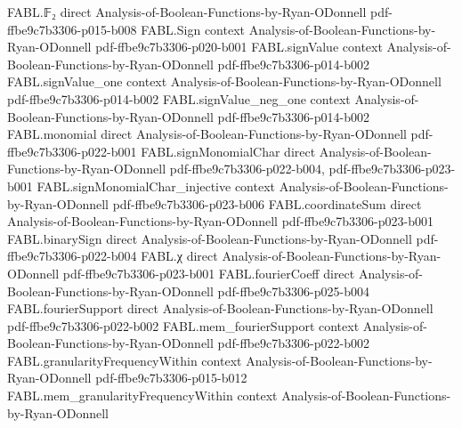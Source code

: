 \begin{theorem}
\label{FABL.sum_restrictedFourierWeight_eq_sum_sq_fourierCoeff}
\leanok
{}
\proofstep
  {FABL.𝔽₂}
  {direct}
  {Analysis-of-Boolean-Functions-by-Ryan-ODonnell}
  {pdf-ffbe9c7b3306-p015-b008}
\proofstep
  {FABL.Sign}
  {context}
  {Analysis-of-Boolean-Functions-by-Ryan-ODonnell}
  {pdf-ffbe9c7b3306-p020-b001}
\proofstep
  {FABL.signValue}
  {context}
  {Analysis-of-Boolean-Functions-by-Ryan-ODonnell}
  {pdf-ffbe9c7b3306-p014-b002}
\proofstep
  {FABL.signValue_one}
  {context}
  {Analysis-of-Boolean-Functions-by-Ryan-ODonnell}
  {pdf-ffbe9c7b3306-p014-b002}
\proofstep
  {FABL.signValue_neg_one}
  {context}
  {Analysis-of-Boolean-Functions-by-Ryan-ODonnell}
  {pdf-ffbe9c7b3306-p014-b002}
\proofstep
  {FABL.monomial}
  {direct}
  {Analysis-of-Boolean-Functions-by-Ryan-ODonnell}
  {pdf-ffbe9c7b3306-p022-b001}
\proofstep
  {FABL.signMonomialChar}
  {direct}
  {Analysis-of-Boolean-Functions-by-Ryan-ODonnell}
  {pdf-ffbe9c7b3306-p022-b004,
    pdf-ffbe9c7b3306-p023-b001}
\proofstep
  {FABL.signMonomialChar_injective}
  {context}
  {Analysis-of-Boolean-Functions-by-Ryan-ODonnell}
  {pdf-ffbe9c7b3306-p023-b006}
\proofstep
  {FABL.coordinateSum}
  {direct}
  {Analysis-of-Boolean-Functions-by-Ryan-ODonnell}
  {pdf-ffbe9c7b3306-p023-b001}
\proofstep
  {FABL.binarySign}
  {direct}
  {Analysis-of-Boolean-Functions-by-Ryan-ODonnell}
  {pdf-ffbe9c7b3306-p022-b004}
\proofstep
  {FABL.χ}
  {direct}
  {Analysis-of-Boolean-Functions-by-Ryan-ODonnell}
  {pdf-ffbe9c7b3306-p023-b001}
\proofstep
  {FABL.fourierCoeff}
  {direct}
  {Analysis-of-Boolean-Functions-by-Ryan-ODonnell}
  {pdf-ffbe9c7b3306-p025-b004}
\proofstep
  {FABL.fourierSupport}
  {direct}
  {Analysis-of-Boolean-Functions-by-Ryan-ODonnell}
  {pdf-ffbe9c7b3306-p022-b002}
\proofstep
  {FABL.mem_fourierSupport}
  {context}
  {Analysis-of-Boolean-Functions-by-Ryan-ODonnell}
  {pdf-ffbe9c7b3306-p022-b002}
\proofstep
  {FABL.granularityFrequencyWithin}
  {context}
  {Analysis-of-Boolean-Functions-by-Ryan-ODonnell}
  {pdf-ffbe9c7b3306-p015-b012}
\proofstep
  {FABL.mem_granularityFrequencyWithin}
  {context}
  {Analysis-of-Boolean-Functions-by-Ryan-ODonnell}

\end{theorem}
